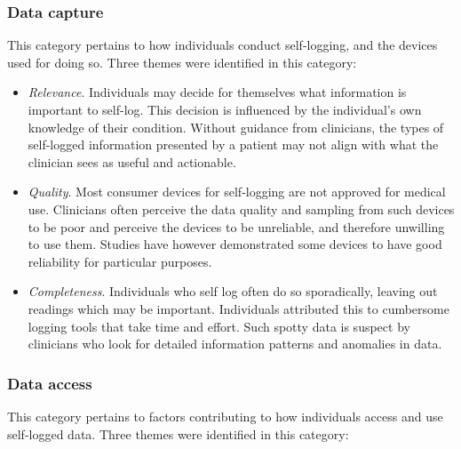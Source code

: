 \documentclass{sigchi}
\begin{document}
\subsubsection{Data capture}

This category pertains to how individuals conduct self-logging, and the devices used for doing so. Three themes were identified in this category:

\begin{itemize}
    \item \textit{Relevance}. Individuals may decide for themselves what information is important to self-log. This decision is influenced by the individual's own knowledge of their condition. Without guidance from clinicians, the types of self-logged information presented by a patient may not align with what the clinician sees as useful and actionable.
    
    \item \textit{Quality}. Most consumer devices for self-logging are not approved for medical use. Clinicians often perceive the data quality and sampling from such devices to be poor and perceive the devices to be unreliable, and therefore unwilling to use them. Studies have however demonstrated some devices to have good reliability for particular purposes.
    
    \item \textit{Completeness}. Individuals who self log often do so sporadically, leaving out readings which may be important. Individuals attributed this to cumbersome logging tools that take time and effort. Such spotty data is suspect by clinicians who look for detailed information patterns and anomalies in data.
\end{itemize}

\subsubsection{Data access}

This category pertains to factors contributing to how individuals access and use self-logged data. Three themes were identified in this category:
\end{document}
